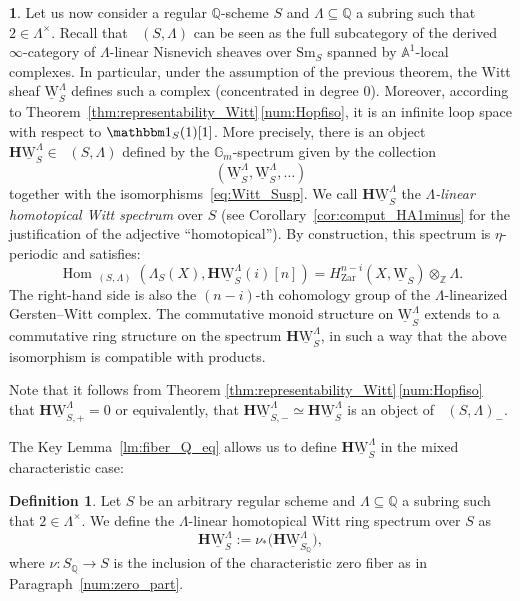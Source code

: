 \documentclass[JEP,XML,SOM,Unicode]{cedram}
\renewcommand{\AA}{\mathbb A}
\newcommand{\un}{\mathbbm 1}
\newcommand{\uW}{\underline{\mathrm W}}
\newcommand{\HuW}{\mathbf H \underline{\mathrm W}}
\newcommand{\eff}{\mathrm{eff}}
\newcommand{\sm}{\mathrm{Sm}}
\DeclareMathOperator{\DA}{D_{\AA^1}}
\DeclareMathOperator{\DAeff}{D_{\AA^1}^{\eff}}
\DeclareMathOperator{\Hom}{Hom}
\newcommand{\ZZ} {\mathbb Z}
\newcommand{\QQ} {\mathbb Q}
\newcommand{\GG} {\mathbb{G}_m}
\newcommand{\zar}{\mathrm{Zar}}
\theoremstyle{remark}
\theoremstyle{definition}
\newtheorem{df}[thm]{Definition}
\newtheorem{num}[thm]{}
\numberwithin{equation}{thm}
\begin{document}
\begin{num}\label{num:unram_Witt_spectrum}
Let us now consider a regular $\QQ$-scheme $S$ and $\Lambda \subseteq \QQ$ a subring such that $2 \in \Lambda^\times$.
Recall that $\DAeff(S,\Lambda)$ can be seen as the full subcategory
of the derived $\infty$\nobreakdash-cat\-egory of $\Lambda$-linear Nisnevich sheaves over $\sm_S$ spanned by $\AA^1$-local complexes.
In particular, under the assumption of the previous theorem,
the Witt sheaf $\uW^\Lambda_S$ defines such a complex
(concentrated in degree $0$). Moreover,
according to Theorem~\ref{thm:representability_Witt}\,\eqref{num:Hopfiso}, it is an infinite loop space with respect to $\un_S(1)[1]$.
More precisely, there is an object $\HuW^\Lambda_S \in \DA(S,\Lambda)$ defined by the $\GG$-spectrum given by the collection
\[
(\uW^\Lambda_S,\uW^\Lambda_S,\hdots)
\]
together with the isomorphisms~\eqref{eq:Witt_Susp}.
We call $\HuW^\Lambda_S$ the \emph{$\Lambda$-linear homotopical Witt spectrum} over $S$ (see Corollary~\ref{cor:comput_HA1minus} for the justification of the adjective ``homotopical'').
By construction, this spectrum is $\eta$-periodic and satisfies:
\[
\Hom_{\DA(S,\Lambda)}(\Lambda_S(X),\HuW^\Lambda_S(i)[n])=H^{n-i}_\zar(X,\uW_S) \otimes_\ZZ \Lambda.
\]
The right-hand side is also the $(n-i)$-th cohomology group of the $\Lambda$-linearized Gersten--Witt complex.
The commutative monoid structure on $\uW^\Lambda_S$ extends
to a commutative ring structure on the spectrum $\HuW^\Lambda_S$,
in such a way that the above isomorphism is compatible with products.

Note that it follows from Theorem \ref{thm:representability_Witt}\,\eqref{num:Hopfiso}
that $\HuW^\Lambda_{S,+}=0$ or equivalently, that $\HuW^\Lambda_{S,-}\simeq\HuW^\Lambda_S$
is an object of $\DA(S,\Lambda)_-$.
\end{num}

The Key Lemma~\ref{lm:fiber_Q_eq} allows us to define $\HuW^\Lambda_S$ in the mixed characteristic case:
\begin{df}\label{df:HW}
Let $S$ be an arbitrary regular scheme and $\Lambda \subseteq \QQ$
a subring such that $2 \in \Lambda^\times$.
We define the $\Lambda$-linear homotopical Witt ring spectrum
over $S$ as
\[
\HuW^\Lambda_S := \nu_*\big(\HuW^\Lambda_{S_\QQ}\big),
\]
where $\nu:S_\QQ \to S$ is the inclusion of the characteristic zero fiber as in Paragraph~\ref{num:zero_part}.
\end{df}
\end{document}
